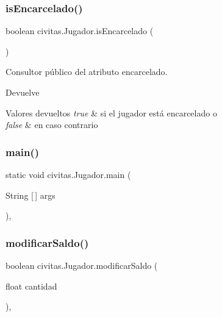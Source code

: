 \subsubsection{\texorpdfstring{is\+Encarcelado()}{isEncarcelado()}}
{\footnotesize\ttfamily boolean civitas.\+Jugador.\+is\+Encarcelado (\begin{DoxyParamCaption}{ }\end{DoxyParamCaption})\hspace{0.3cm}{\ttfamily [inline]}}

Consultor público del atributo encarcelado. \begin{DoxyReturn}{Devuelve}

\end{DoxyReturn}

\begin{DoxyRetVals}{Valores devueltos}
{\em true} & si el jugador está encarcelado o \\
\hline
{\em false} & en caso contrario \\
\hline
\end{DoxyRetVals}
\mbox{\label{classcivitas_1_1Jugador_a5ffd1393041fb0afa52d8d4a9572cdf2}} 
\subsubsection{\texorpdfstring{main()}{main()}}
{\footnotesize\ttfamily static void civitas.\+Jugador.\+main (\begin{DoxyParamCaption}\item[{String \mbox{[}$\,$\mbox{]}}]{args }\end{DoxyParamCaption})\hspace{0.3cm}{\ttfamily [inline]}, {\ttfamily [static]}}

\mbox{\label{classcivitas_1_1Jugador_ae091c2f1256a809aab42c1478056a861}} 
\subsubsection{\texorpdfstring{modificar\+Saldo()}{modificarSaldo()}}
{\footnotesize\ttfamily boolean civitas.\+Jugador.\+modificar\+Saldo (\begin{DoxyParamCaption}\item[{float}]{cantidad }\end{DoxyParamCaption})\hspace{0.3cm}{\ttfamily [inline]}, {\ttfamily [package]}}

